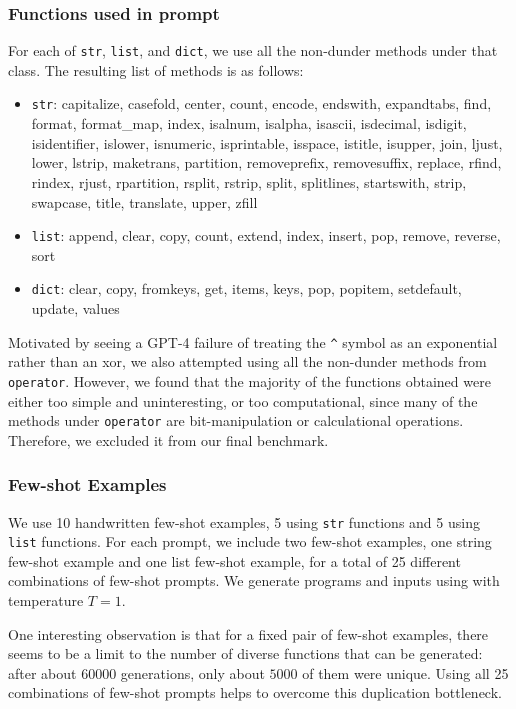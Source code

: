 \subsubsection{Functions used in prompt} \label{appendix:benchmark-generation-functions}
For each of \texttt{str}, \texttt{list}, and \texttt{dict}, we use all the non-dunder methods under that class. The resulting list of methods is as follows:
\begin{itemize}
    \item \texttt{str}: capitalize, casefold, center, count, encode, endswith, expandtabs, find, format, format\_map, index, isalnum, isalpha, isascii, isdecimal, isdigit, isidentifier, islower, isnumeric, isprintable, isspace, istitle, isupper, join, ljust, lower, lstrip, maketrans, partition, removeprefix, removesuffix, replace, rfind, rindex, rjust, rpartition, rsplit, rstrip, split, splitlines, startswith, strip, swapcase, title, translate, upper, zfill
    \item \texttt{list}: append, clear, copy, count, extend, index, insert, pop, remove, reverse, sort
    \item \texttt{dict}: clear, copy, fromkeys, get, items, keys, pop, popitem, setdefault, update, values
\end{itemize}

Motivated by seeing a GPT-4 failure of treating the \texttt{\^} symbol as an exponential rather than an xor, we also attempted using all the non-dunder methods from \texttt{operator}. However, we found that the majority of the functions obtained were either too simple and uninteresting, or too computational, since many of the methods under \texttt{operator} are bit-manipulation or calculational operations. Therefore, we excluded it from our final benchmark.

\subsubsection{Few-shot Examples} \label{appendix:benchmark-generation-fewshot}
We use 10 handwritten few-shot examples, 5 using \texttt{str} functions and 5 using \texttt{list} functions. For each prompt, we include two few-shot examples, one string few-shot example and one list few-shot example, for a total of 25 different combinations of few-shot prompts. We generate programs and inputs using \codellamalarge with temperature $T=1$. 

One interesting observation is that for a fixed pair of few-shot examples, there seems to be a limit to the number of diverse functions that can be generated: after about $60000$ generations, only about $5000$ of them were unique. Using all 25 combinations of few-shot prompts helps to overcome this duplication bottleneck.

